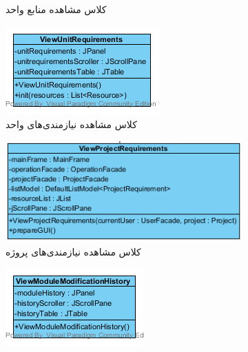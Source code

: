 \begin{figure}[H]
\begin{subfigure}[b]{0.3\textwidth}
		\caption{کلاس مشاهده منابع واحد}
	\end{subfigure}
	\hfill
	\begin{subfigure}[b]{0.4\textwidth}
		\includegraphics[width=\textwidth]{img/class-design/ui/ViewUnitRequirements.png}
		\caption{کلاس مشاهده نیازمندی‌های واحد}
	\end{subfigure}
	\hfill
		\begin{subfigure}[b]{0.4\textwidth}
			\includegraphics[width=\textwidth]{img/class-design/ui/ViewProjectRequirements}
			\caption{کلاس مشاهده نیازمندی‌های پروژه}
		\end{subfigure}
	\hfill
	\begin{subfigure}[b]{0.3\textwidth}
		\includegraphics[width=\textwidth]{img/class-design/ui/ViewModuleModificationHistory.png}

\end{subfigure}
\end{figure}
